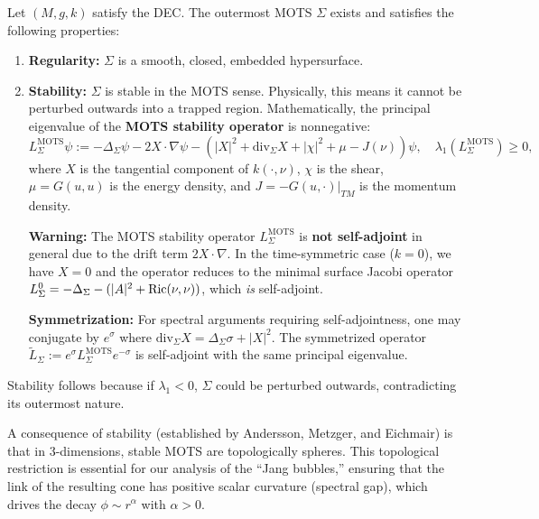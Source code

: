 \begin{theorem}\label{thm:MOTS_Properties}
Let $(M,g,k)$ satisfy the DEC. The outermost MOTS $\Sigma$ exists and satisfies the following properties:
\begin{enumerate}
    \item \textbf{Regularity:} $\Sigma$ is a smooth, closed, embedded hypersurface.
    \item \textbf{Stability:} $\Sigma$ is stable in the MOTS sense. Physically, this means it cannot be perturbed outwards into a trapped region. Mathematically, the principal eigenvalue of the \textbf{MOTS stability operator} is nonnegative:
    \[ L_\Sigma^{\text{MOTS}} \psi := -\Delta_\Sigma \psi - 2X \cdot \nabla \psi - (|X|^2 + \mathrm{div}_\Sigma X + |\chi|^2 + \mu - J(\nu)) \psi, \quad \lambda_1(L_\Sigma^{\text{MOTS}}) \ge 0, \]
    where $X$ is the tangential component of $k(\cdot, \nu)$, $\chi$ is the shear, $\mu = G(u,u)$ is the energy density, and $J = -G(u, \cdot)|_{TM}$ is the momentum density.
    
    \textbf{Warning:} The MOTS stability operator $L_\Sigma^{\text{MOTS}}$ is \textbf{not self-adjoint} in general due to the drift term $2X \cdot \nabla$. In the time-symmetric case ($k = 0$), we have $X = 0$ and the operator reduces to the minimal surface Jacobi operator $L_\Sigma^0 = -\Delta_\Sigma - (|A|^2 + \mathrm{Ric}(\nu,\nu))$, which \emph{is} self-adjoint.
    
    \textbf{Symmetrization:} For spectral arguments requiring self-adjointness, one may conjugate by $e^{\sigma}$ where $\mathrm{div}_\Sigma X = \Delta_\Sigma \sigma + |X|^2$. The symmetrized operator $\tilde{L}_\Sigma := e^{\sigma} L_\Sigma^{\text{MOTS}} e^{-\sigma}$ is self-adjoint with the same principal eigenvalue.
\end{enumerate}
Stability follows because if $\lambda_1 < 0$, $\Sigma$ could be perturbed outwards, contradicting its outermost nature.
\end{theorem}

\begin{remark}
A consequence of stability (established by Andersson, Metzger, and Eichmair) is that in 3-dimensions, stable MOTS are topologically spheres. This topological restriction is essential for our analysis of the ``Jang bubbles,'' ensuring that the link of the resulting cone has positive scalar curvature (spectral gap), which drives the decay $\phi \sim r^\alpha$ with $\alpha > 0$.
\end{remark}

